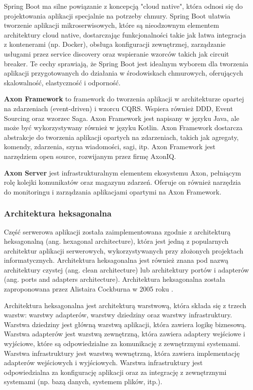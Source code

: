 Spring Boot ma silne powiązanie z koncepcją "cloud native", która odnosi się do projektowania aplikacji specjalnie na potrzeby chmury. Spring Boot ułatwia tworzenie aplikacji mikroserwisowych, które są nieodzownym elementem architektury cloud native, dostarczając funkcjonalności takie jak łatwa integracja z kontenerami (np. Docker), obsługa konfiguracji zewnętrznej, zarządzanie usługami przez service discovery oraz wspieranie wzorców takich jak circuit breaker. Te cechy sprawiają, że Spring Boot jest idealnym wyborem dla tworzenia aplikacji przygotowanych do działania w środowiskach chmurowych, oferujących skalowalność, elastyczność i odporność.

\textbf{Axon Framework} to framework do tworzenia aplikacji w architekturze opartej na zdarzeniach (event-driven) i wzorcu CQRS. Wspiera również DDD, Event Sourcing oraz wzorzec Saga. Axon Framework jest napisany w języku Java, ale może być wykorzystywany również w języku Kotlin. Axon Framework dostarcza abstrakcje do tworzenia aplikacji opartych na zdarzeniach, takich jak agregaty, komendy, zdarzenia, szyna wiadomości, sagi, itp. Axon Framework jest narzędziem open source, rozwijanym przez firmę AxonIQ.

\textbf{Axon Server} jest infrastrukturalnym elementem ekosystemu Axon, pełniącym rolę kolejki komunikatów oraz magazynu zdarzeń. Oferuje on również narzędzia do monitoringu i zarządzania aplikacjami opartymi na Axon Framework.

\subsubsection{Architektura heksagonalna}

Część serwerowa aplikacji została zaimplementowana zgodnie z architekturą heksagonalną (ang. hexagonal architecture), która jest jedną z popularnych architektur aplikacji serwerowych, wykorzystywanych przy złożonych projektach informatycznych. Architektura heksagonalna jest również znana pod nazwą architektury czystej (ang. clean architecture) lub architektury portów i adapterów (ang. ports and adapters architecture). Architektura heksagonalna została zaproponowana przez Alistaira Cockburna w 2005 roku \cite{cockburn2005hexagonal}.

Architektura heksagonalna jest architekturą warstwową, która składa się z trzech warstw: warstwy adapterów, warstwy dziedziny oraz warstwy infrastruktury. Warstwa dziedziny jest główną warstwą aplikacji, która zawiera logikę biznesową. Warstwa adapterów jest warstwą zewnętrzną, która zawiera adaptery wejściowe i wyjściowe, które są odpowiedzialne za komunikację z zewnętrznymi systemami. Warstwa infrastruktury jest warstwą wewnętrzną, która zawiera implementację adapterów wejściowych i wyjściowych. Warstwa infrastruktury jest odpowiedzialna za konfigurację aplikacji oraz za integrację z zewnętrznymi systemami (np. bazą danych, systemem plików, itp.).

